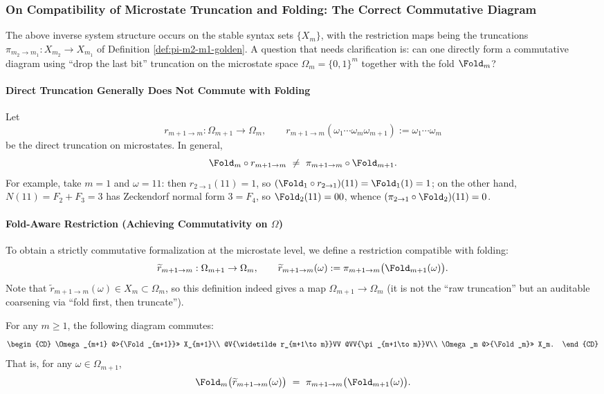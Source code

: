 \subsubsection{On Compatibility of Microstate Truncation and Folding: The Correct Commutative Diagram}\label{subsec:fold-omega-restriction}
The above inverse system structure occurs on the stable syntax sets $\{X_m\}$, with the restriction maps being the truncations $\pi_{m_2\to m_1}:X_{m_2}\to X_{m_1}$ of Definition \ref{def:pi-m2-m1-golden}. A question that needs clarification is: can one directly form a commutative diagram using ``drop the last bit'' truncation on the microstate space $\Omega_m=\{0,1\}^m$ together with the fold $\Fold_m$?

\paragraph{Direct Truncation Generally Does Not Commute with Folding}
Let
\[
r_{m+1\to m}:\Omega_{m+1}\to\Omega_m,\qquad
r_{m+1\to m}(\omega_1\cdots\omega_m\omega_{m+1}):=\omega_1\cdots\omega_m
\]
be the direct truncation on microstates. In general,
\[
\Fold_m\circ r_{m+1\to m}\ \neq\ \pi_{m+1\to m}\circ \Fold_{m+1}.
\]
For example, take $m=1$ and $\omega=11$: then $r_{2\to 1}(11)=1$, so $(\Fold_1\circ r_{2\to 1})(11)=\Fold_1(1)=1$; on the other hand, $N(11)=F_2+F_3=3$ has Zeckendorf normal form $3=F_4$, so $\Fold_2(11)=00$, whence $(\pi_{2\to 1}\circ \Fold_2)(11)=0$.

\paragraph{Fold-Aware Restriction (Achieving Commutativity on $\Omega$)}
To obtain a strictly commutative formalization at the microstate level, we define a restriction compatible with folding:
\[
\widetilde r_{m+1\to m}:\Omega_{m+1}\to \Omega_m,\qquad
\widetilde r_{m+1\to m}(\omega):=\pi_{m+1\to m}\bigl(\Fold_{m+1}(\omega)\bigr).
\]
Note that $\widetilde r_{m+1\to m}(\omega)\in X_m\subset\Omega_m$, so this definition indeed gives a map $\Omega_{m+1}\to\Omega_m$ (it is not the ``raw truncation'' but an auditable coarsening via ``fold first, then truncate'').

\begin{proposition}\label{prop:fold-omega-commute}
For any $m\ge 1$, the following diagram commutes:
\[
\begin{CD}
\Omega_{m+1} @>{\Fold_{m+1}}>> X_{m+1}\\
@V{\widetilde r_{m+1\to m}}VV @VV{\pi_{m+1\to m}}V\\
\Omega_m @>{\Fold_m}>> X_m.
\end{CD}
\]
That is, for any $\omega\in\Omega_{m+1}$,
\[
\Fold_m\bigl(\widetilde r_{m+1\to m}(\omega)\bigr)
\ =\
\pi_{m+1\to m}\bigl(\Fold_{m+1}(\omega)\bigr).
\]
\end{proposition}

